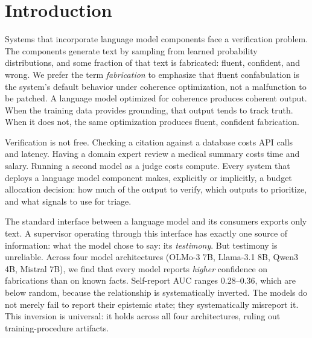 \section{Introduction}\label{sec:intro}


Systems that incorporate language model components face a verification
problem. The components generate text by sampling from learned probability
distributions, and some fraction of that text is fabricated: fluent,
confident, and wrong. We prefer the term \emph{fabrication} to emphasize
that fluent confabulation is the system's default behavior under coherence
optimization, not a malfunction to be patched. A language model optimized
for coherence produces coherent output. When the training data provides
grounding, that output tends to track truth. When it does not, the same
optimization produces fluent, confident fabrication.

Verification is not free. Checking a citation against a database costs API
calls and latency. Having a domain expert review a medical summary costs
time and salary. Running a second model as a judge costs compute. Every
system that deploys a language model component makes, explicitly or
implicitly, a budget allocation decision: how much of the output to verify,
which outputs to prioritize, and what signals to use for triage.


The standard interface between a language model and its consumers exports
only text. A supervisor operating through this interface has exactly one
source of information: what the model chose to say: its \emph{testimony}.
But testimony is unreliable. Across four model architectures (OLMo-3 7B,
Llama-3.1 8B, Qwen3 4B, Mistral 7B), we find that every model reports
\emph{higher} confidence on fabrications than on known facts. Self-report
AUC ranges 0.28--0.36, which are below random, because the relationship is
systematically inverted. The models do not merely fail to report their
epistemic state; they systematically misreport it. This inversion is
universal: it holds across all four architectures, ruling out
training-procedure artifacts.

